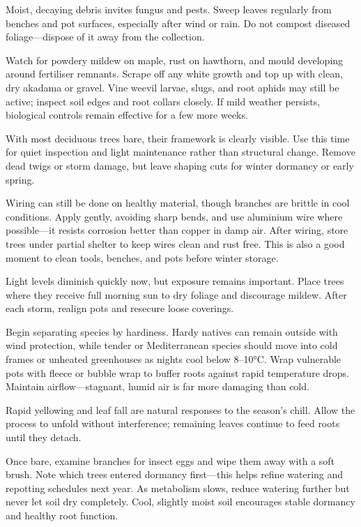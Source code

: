 \medskip
{}
\noindent
Moist, decaying debris invites fungus and pests.
Sweep leaves regularly from benches and pot surfaces, especially after wind or rain.
Do not compost diseased foliage---dispose of it away from the collection.

Watch for powdery mildew on maple, rust on hawthorn, and mould developing around fertiliser remnants.
Scrape off any white growth and top up with clean, dry akadama or gravel.
Vine weevil larvae, slugs, and root aphids may still be active; inspect soil edges and root collars closely.
If mild weather persists, biological controls remain effective for a few more weeks.

\medskip
{}
\noindent
With most deciduous trees bare, their framework is clearly visible.
Use this time for quiet inspection and light maintenance rather than structural change.
Remove dead twigs or storm damage, but leave shaping cuts for winter dormancy or early spring.

Wiring can still be done on healthy material, though branches are brittle in cool conditions.
Apply gently, avoiding sharp bends, and use aluminium wire where possible---it resists corrosion better than copper in damp air.
After wiring, store trees under partial shelter to keep wires clean and rust free.
This is also a good moment to clean tools, benches, and pots before winter storage.

\medskip
{}
\noindent
Light levels diminish quickly now, but exposure remains important.
Place trees where they receive full morning sun to dry foliage and discourage mildew.
After each storm, realign pots and resecure loose coverings.

Begin separating species by hardiness.
Hardy natives can remain outside with wind protection, while tender or Mediterranean species should move into cold frames or unheated greenhouses as nights cool below 8–10°C.
Wrap vulnerable pots with fleece or bubble wrap to buffer roots against rapid temperature drops.
Maintain airflow---stagnant, humid air is far more damaging than cold.

\medskip
{}
\noindent
Rapid yellowing and leaf fall are natural responses to the season's chill.
Allow the process to unfold without interference; remaining leaves continue to feed roots until they detach.

Once bare, examine branches for insect eggs and wipe them away with a soft brush.
Note which trees entered dormancy first---this helps refine watering and repotting schedules next year.
As metabolism slows, reduce watering further but never let soil dry completely.
Cool, slightly moist soil encourages stable dormancy and healthy root function.

